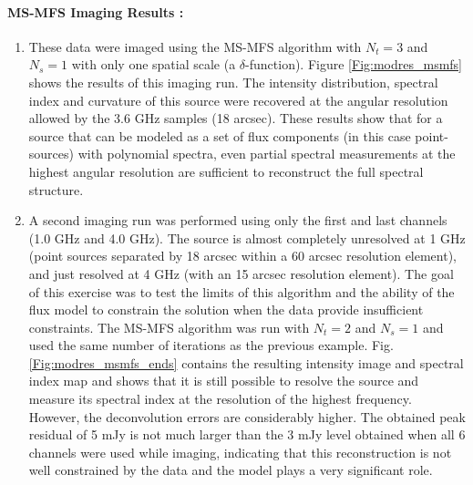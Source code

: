 \documentclass[structabstract]{stylefiles/aa}
\begin{document}
\paragraph{MS-MFS Imaging Results : }
\begin{enumerate}
\item These data were imaged using the MS-MFS algorithm with $N_t=3$ and 
$N_s=1$ with only one spatial scale (a $\delta$-function).
Figure \ref{Fig:modres_msmfs} shows the results of this imaging run.
The intensity distribution, spectral index and curvature of this source were
recovered at the angular resolution allowed by the 3.6 GHz samples
(18 arcsec). 
These results show that for a source that can be modeled as a set
of flux components (in this case point-sources) with polynomial spectra,
even partial spectral measurements at the highest angular resolution
are sufficient to reconstruct the full spectral structure.

\item A second imaging run was performed using only 
the first and last channels (1.0 GHz and 4.0 GHz).
The source is almost completely 
unresolved at 1 GHz (point sources separated by 18 arcsec 
within a 60 arcsec resolution element), and just resolved at 4 GHz
(with an 15 arcsec resolution element).
The goal of this exercise was to test the limits of this algorithm
and the ability of the flux model to constrain the solution when
the data provide insufficient constraints.
The MS-MFS algorithm was run with $N_t=2$ and $N_s=1$ and used the
same number of iterations as the previous example.
Fig.\ref{Fig:modres_msmfs_ends} contains the resulting 
intensity image and spectral index map and shows that it
is still possible to resolve the source and measure its spectral
index at the resolution of the highest frequency. However, the
deconvolution errors are considerably higher.
The obtained peak residual of 5 mJy is not much larger than the
3 mJy level obtained when all 6 channels were used while imaging, 
indicating that this reconstruction is not well constrained by
the data and the model plays a very significant role.
\end{enumerate}
\end{document}
